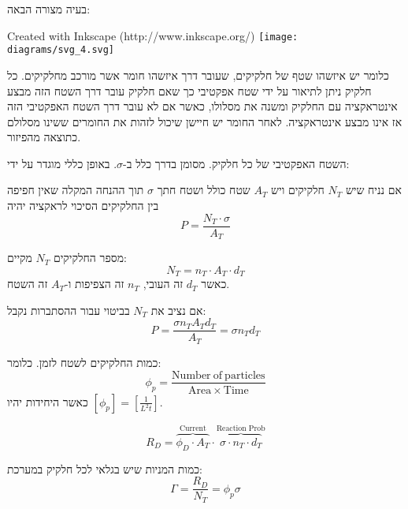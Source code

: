\documentclass{tstextbook}
\begin{document}
\begin{definition}
בעיה מצורה הבאה:

 Created with Inkscape (http://www.inkscape.org/) \texttt{[image: diagrams/svg\_4.svg]}
\end{definition}
כלומר יש איזשהו שטף של חלקיקים, שעובר דרך איזשהו חומר אשר מורכב מחלקיקים. כל חלקיק ניתן לתיאור על ידי שטח אפקטיבי כך שאם חלקיק עובר דרך השטח הזה מבצע אינטראקציה עם החלקיק ומשנה את מסלולו, כאשר אם לא עובר דרך השטח האפקטיבי הזה אז אינו מבצע אינטראקציה. לאחר החומר יש חיישן שיכול לזהות את החומרים ששינו מסלולם כתוצאה מהפיזור.

\begin{definition}
השטח האפקטיבי של כל חלקיק. מסומן בדרך כלל ב-\(\sigma\). באופן כללי מוגדר על ידי:

\end{definition}
\begin{corollary}
אם נניח שיש \(N_{T}\) חלקיקים ויש \(A_{T}\) שטח כולל ושטח חתך \(\sigma\) תוך ההנחה המקלה שאין חפיפה בין החלקיקים הסיכוי לראקציה יהיה
$$P=\frac{N_{T}\cdot \sigma}{A_{T}}$$

\end{corollary}
\begin{proposition}
מספר החלקיקים \(N_{T}\) מקיים:
$$N_{T}=n_{T}\cdot A_{T} \cdot d_{T}$$
כאשר \(d_{T}\) זה העובי, \(n_{T}\) זה הצפיפות ו-\(A_{T}\) זה השטח.

\end{proposition}
\begin{corollary}
אם נציב את \(N_{T}\) בביטוי עבור ההסתברות נקבל:
$$P=\frac{\sigma n_{T}A_{T}d_{T}}{A_{T}}=\sigma n_{T}d_{T}$$

\end{corollary}
\begin{definition}
כמות החלקיקים לשטח לזמן. כלומר:
$$\phi_{p}=\frac{\mathrm{Number~of~particles}}{\mathrm{Area}\times\mathrm{Time}}$$
כאשר היחידות יהיו \(\left[ \phi_{p} \right]=\left[ \frac{1}{L^{2}t} \right]\).

\end{definition}
\begin{definition}
$$R_{D}=\overbrace{ \phi_{D}\cdot A_{T} }^{ \text{Current} }\cdot \overbrace{ \sigma \cdot n_{T}\cdot d_{T} }^{ \text{Reaction Prob} }$$

\end{definition}
\begin{definition}
כמות המניות שיש בגלאי לכל חלקיק במערכת:
$$\Gamma=\frac{R_{D}}{N_{T}}=\phi_{p}\sigma$$

\end{definition}
\end{document}
